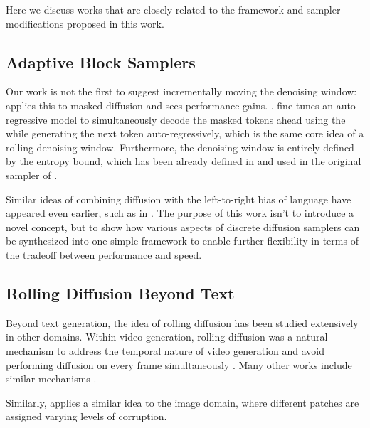 Here we discuss works that are closely related to the framework and sampler modifications proposed in this work.

\subsection{Adaptive Block Samplers}
Our work is not the first to suggest incrementally moving the denoising window: \citet{luo2026dsb} applies this to masked diffusion and sees performance gains. \citet{gat2025set, arriola2025blockdiffusioninterpolatingautoregressive}.
\citet{gat2025set} fine-tunes an auto-regressive model to simultaneously decode the masked tokens ahead using the \citet{ben2026accelerated} while generating the next token auto-regressively, which is the same core idea of a rolling denoising window.
Furthermore, the denoising window is entirely defined by the entropy bound, which has been already defined in \citet{ben2026accelerated} and used in the original sampler of \citet{team2026diffusiongemma}.

Similar ideas of combining diffusion with the left-to-right bias of language have appeared even earlier, such as in \citep{wu2023ar}.
The purpose of this work isn't to introduce a novel concept, but to show how various aspects of discrete diffusion samplers can be synthesized into one simple framework to enable further flexibility in terms of the tradeoff between performance and speed.

\subsection{Rolling Diffusion Beyond Text}
Beyond text generation, the idea of rolling diffusion has been studied extensively in other domains.
Within video generation, rolling diffusion was a natural mechanism to address the temporal nature of video generation and avoid performing diffusion on every frame simultaneously \citep{ruhe2024rolling}. 
Many other works include similar mechanisms \citep{chen2024diffusion, song2025history, xie2025progressive}.

Similarly, \citet{papa2026asyncpatch} applies a similar idea to the image domain, where different patches are assigned varying levels of corruption.
